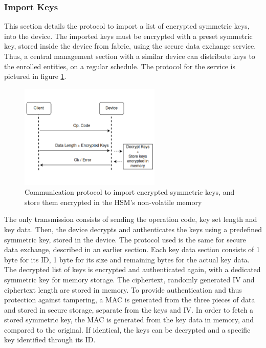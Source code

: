 \subsubsection{Import Keys}\label{chap:arch:services:new-comms:import}

This section details the protocol to import a list of encrypted symmetric keys, into the device.
The imported keys must be encrypted with a preset symmetric key, stored inside the device from fabric, using the secure data exchange service. Thus, a central management section with a similar device can distribute keys to the enrolled entities, on a regular schedule.
The protocol for the service is pictured in figure \ref{fig:protocol:import-keys}.

\begin{figure}[h!]
	\centering
	\includegraphics[width=0.60\textwidth]{./Images/import-keys.png}
	\caption{Communication protocol to import encrypted symmetric keys, and store them encrypted in the HSM's non-volatile memory}
	\label{fig:protocol:import-keys}
\end{figure}

The only transmission consists of sending the operation code, key set length and key data. Then, the device decrypts and authenticates the keys using a predefined symmetric key, stored in the device. The protocol used is the same for secure data exchange, described in an earlier section.
Each key data section consists of 1 byte for its ID, 1 byte for its size and remaining bytes for the actual key data.
The decrypted list of keys is encrypted and authenticated again, with a dedicated symmetric key for memory storage. The ciphertext, randomly generated IV and ciphertext length are stored in memory. To provide authentication and thus protection against tampering, a MAC is generated from the three pieces of data and stored in secure storage, separate from the keys and IV.
In order to fetch a stored symmetric key, the MAC is generated from the key data in memory, and compared to the original. If identical, the keys can be decrypted and a specific key identified through its ID.

